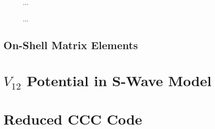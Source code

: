 \documentclass{article}
\begin{document}
\begin{figure}[h]
  \begin{center}
    
  \end{center}
  \caption[Exchange Matrix Elements 1s-2s]{
    ...
  }
  \label{fig:exc-me-1s-2s}
\end{figure}

\begin{figure}[h]
  \begin{center}
    
  \end{center}
  \caption[Exchange Matrix Elements 1s-3s]{
    ...
  }
  \label{fig:exc-me-1s-3s}
\end{figure}

\clearpage

\subsection{On-Shell Matrix Elements}
\label{sec:on-me}

%       
%       

\clearpage

\section{$V_{1 2}$ Potential in S-Wave Model}
\label{sec:v12-swave}

\section{Reduced CCC Code}
\label{sec:reduced-ccc-code}
\end{document}
